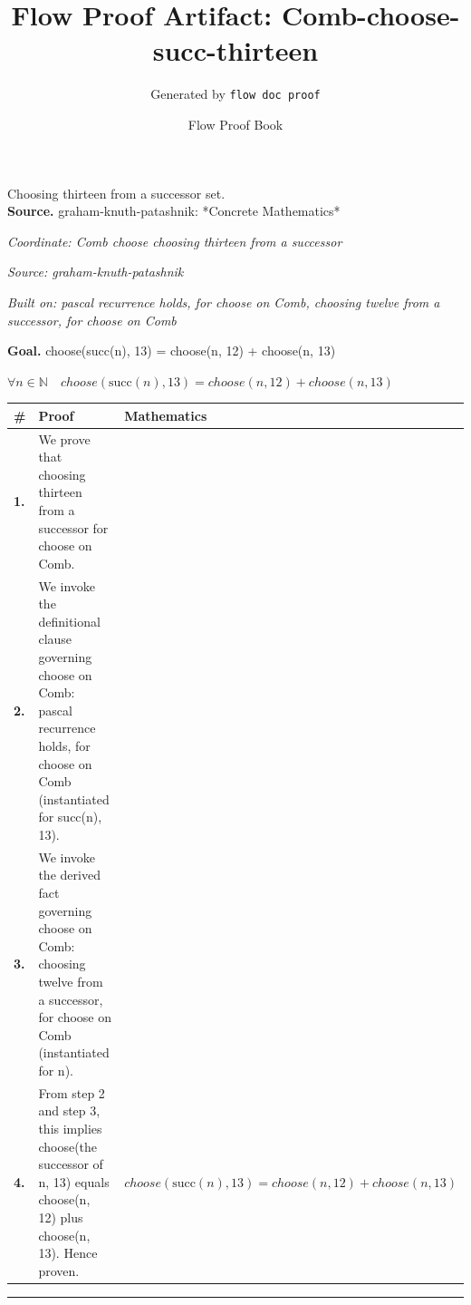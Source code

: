 \documentclass[11pt]{article}
\title{Flow Proof Artifact: Comb-choose-succ-thirteen}
\author{Generated by \texttt{flow doc proof}}
\date{Flow Proof Book}
\theoremstyle{definition}
\begin{document}
\maketitle
Choosing thirteen from a successor set.\\[0.5em]
\textbf{Source.} graham-knuth-patashnik: *Concrete Mathematics*\\[0.5em]
\bigskip
{}\par
\smallskip\noindent\textit{Coordinate: Comb \cdot choose \cdot choosing thirteen from a successor}\par
\smallskip\noindent\textit{Source: graham-knuth-patashnik}\par
\smallskip\noindent\textit{Built on: pascal recurrence holds, for choose on Comb, choosing twelve from a successor, for choose on Comb}\par
\medskip
\noindent\textbf{Goal.} choose(succ(n), 13) = choose(n, 12) + choose(n, 13)\par
\noindent$\displaystyle \forall n \in \mathbb{N}\quad choose(\mathrm{succ}(n), 13) = choose(n, 12) + choose(n, 13)$\par
\medskip
\noindent
\begin{tabular}{@{} >{\raggedright\arraybackslash}p{} >{\raggedright\arraybackslash}p{} >{\raggedleft\arraybackslash}p{} @{}}
\textbf{\#} & \textbf{Proof} & \textbf{Mathematics} \\
\midrule
\textbf{1.} & We prove that choosing thirteen from a successor for choose on Comb. & \\[0.45em]
\textbf{2.} & We invoke the definitional clause governing choose on Comb: pascal recurrence holds, for choose on Comb (instantiated for succ(n), 13). & \\[0.45em]
\textbf{3.} & We invoke the derived fact governing choose on Comb: choosing twelve from a successor, for choose on Comb (instantiated for n). & \\[0.45em]
\textbf{4.} & From step 2 and step 3, this implies choose(the successor of n, 13) equals choose(n, 12) plus choose(n, 13). Hence proven. & $\displaystyle choose(\mathrm{succ}(n), 13) = choose(n, 12) + choose(n, 13)$ \\[0.45em]
\bottomrule
\end{tabular}
\label{thm:Comb-choose-choosing_thirteen_from_a_successor}
\par\medskip\hrule
\end{document}
